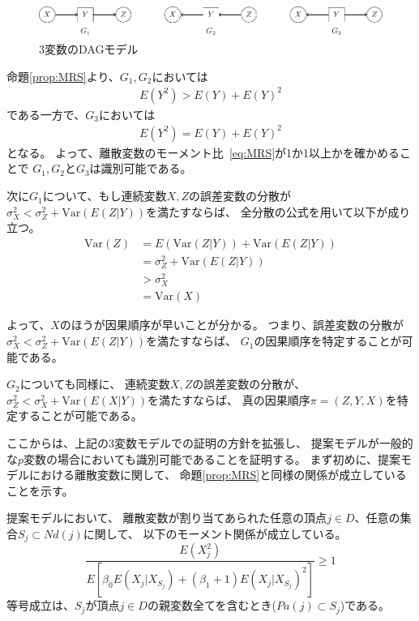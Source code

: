 \begin{figure}[ht]
  \centering
  \includegraphics{./picture/prop_three_variate.pdf}
  \caption{3変数のDAGモデル}
  \label{fig:prop_three_variate}
\end{figure}

命題\ref{prop:MRS}より、$G_1, G_2$においては
\begin{align*}
  E(Y^2) > E(Y) + E(Y)^2
\end{align*}
である一方で、$G_3$においては
\begin{align*}
  E(Y^2) = E(Y) + E(Y)^2
\end{align*}
となる。
よって、離散変数のモーメント比~\eqref{eq:MRS}が1か1以上かを確かめることで
$G_1, G_2$と$G_3$は識別可能である。

次に$G_1$について、もし連続変数$X, Z$の誤差変数の分散が
$\sigma_X^2 < \sigma_Z^2 + \mathrm{Var}(E(Z|Y))$を満たすならば、
全分散の公式を用いて以下が成り立つ。
\begin{align*}
  \mathrm{Var}(Z) &= E(\mathrm{Var}(Z|Y)) + \mathrm{Var}(E(Z|Y)) \\
                  &= \sigma_Z^2 + \mathrm{Var}(E(Z|Y)) \\
                  &> \sigma_X^2 \\
                  &= \mathrm{Var}(X)
\end{align*}

よって、$X$のほうが因果順序が早いことが分かる。
つまり、誤差変数の分散が$\sigma_X^2 < \sigma_Z^2 + \mathrm{Var}(E(Z|Y))$を満たすならば、
$G_1$の因果順序を特定することが可能である。

$G_2$についても同様に、
連続変数$X, Z$の誤差変数の分散が、
$\sigma_Z^2 < \sigma_X^2 + \mathrm{Var}(E(X|Y))$を満たすならば、
真の因果順序$\pi = (Z, Y, X)$を特定することが可能である。


ここからは、上記の3変数モデルでの証明の方針を拡張し、
提案モデルが一般的な$p$変数の場合においても識別可能であることを証明する。
まず初めに、提案モデルにおける離散変数に関して、
命題\ref{prop:MRS}と同様の関係が成立していることを示す。

\begin{lemm}
  提案モデルにおいて、
  離散変数が割り当てあられた任意の頂点$j \in D$、任意の集合$S_j \subset \mathit{Nd}(j)$に関して、
  以下のモーメント関係が成立している。
  \begin{equation}
    \frac{E(X_j^2)}
    {E \left[ \beta_0 E(X_j | X_{S_j}) + (\beta_1 + 1)E(X_j | X_{S_j})^2 \right]}
    \geq 1
    \label{prop_MRS}
  \end{equation}
  等号成立は、$S_j$が頂点$j \in D$の親変数全てを含むとき($Pa(j) \subset S_j$)である。
  \label{lem_prop_MRS}
\end{lemm}

